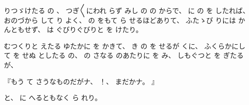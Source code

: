 
りつゞけたる
の
、
%
つぎ〳〵にわれ
らず
みし
の
の
からで、
%
に
の
を
したれば、
%
おのづから
して
り
よく、
%
の
をもて
ら
せるほどありて、
%
ふたゝび
りには
かんともせず、
%
は
ぐびりぐびりと
を
けたり。

むつくりと
えたる
ゆたかに
を
かきて、
%
き
の
を
せるが
くに、
%
ふくらかにして
を
せぬ
としたる
の、
%
の
さなる
のあたりに
を
み、
%
しもぐつと
を
ぎたるが、

『もう
て
さうなものだがナ、
%
！、
%
まだかナ。
』

と、
%
に
へるともなく
ら
れり。

